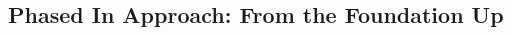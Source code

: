 \documentclass[11pt, aspectratio=169]{beamer}
\newcommand{\highlite}[1]{{\color{Carnellian} #1}}
\begin{document}
{\begin{columns}
\begin{column}{0.3\linewidth}

  
  
  
\end{column}

\end{columns}
}


\subsection{Phased In Approach: From the Foundation Up}
\end{document}
